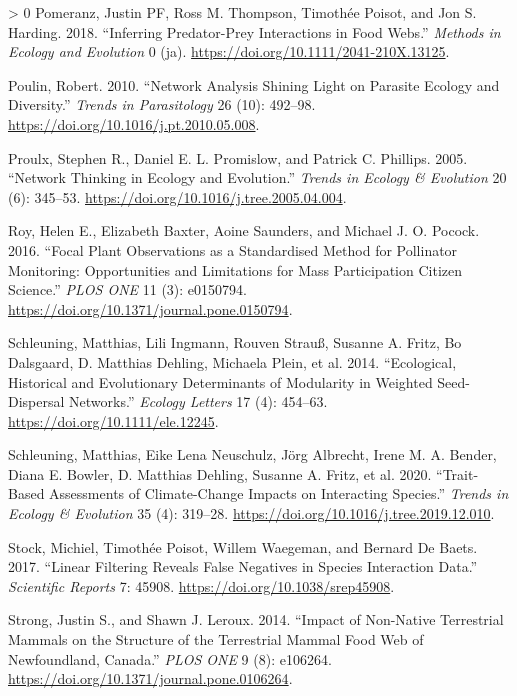 \documentclass[11pt]{article}
\newlength{\cslhangindent}
\newenvironment{CSLReferences}[3] %
 {%
  \setlength{\parindent}{0pt}
  \ifodd #1 \everypar{\setlength{\hangindent}{\cslhangindent}}\ignorespaces\fi
  \ifnum #2 > 0
  \setlength{\parskip}{#2\baselineskip}
  \fi
 }%
 {}
\begin{document}
\begin{CSLReferences}{1}{0}
\leavevmode\hypertarget{ref-Pomeranz2018InfPre}{}%
Pomeranz, Justin PF, Ross M. Thompson, Timothée Poisot, and Jon S.
Harding. 2018. {``Inferring Predator-Prey Interactions in Food Webs.''}
\emph{Methods in Ecology and Evolution} 0 (ja).
\url{https://doi.org/10.1111/2041-210X.13125}.

\leavevmode\hypertarget{ref-Poulin2010NetAna}{}%
Poulin, Robert. 2010. {``Network Analysis Shining Light on Parasite
Ecology and Diversity.''} \emph{Trends in Parasitology} 26 (10):
492--98. \url{https://doi.org/10.1016/j.pt.2010.05.008}.

\leavevmode\hypertarget{ref-Proulx2005NetThi}{}%
Proulx, Stephen R., Daniel E. L. Promislow, and Patrick C. Phillips.
2005. {``Network Thinking in Ecology and Evolution.''} \emph{Trends in
Ecology \& Evolution} 20 (6): 345--53.
\url{https://doi.org/10.1016/j.tree.2005.04.004}.

\leavevmode\hypertarget{ref-Roy2016FocPla}{}%
Roy, Helen E., Elizabeth Baxter, Aoine Saunders, and Michael J. O.
Pocock. 2016. {``Focal Plant Observations as a Standardised Method for
Pollinator Monitoring: Opportunities and Limitations for Mass
Participation Citizen Science.''} \emph{PLOS ONE} 11 (3): e0150794.
\url{https://doi.org/10.1371/journal.pone.0150794}.

\leavevmode\hypertarget{ref-Schleuning2014EcoHis}{}%
Schleuning, Matthias, Lili Ingmann, Rouven Strauß, Susanne A. Fritz, Bo
Dalsgaard, D. Matthias Dehling, Michaela Plein, et al. 2014.
{``Ecological, Historical and Evolutionary Determinants of Modularity in
Weighted Seed-Dispersal Networks.''} \emph{Ecology Letters} 17 (4):
454--63. \url{https://doi.org/10.1111/ele.12245}.

\leavevmode\hypertarget{ref-Schleuning2020TraAss}{}%
Schleuning, Matthias, Eike Lena Neuschulz, Jörg Albrecht, Irene M. A.
Bender, Diana E. Bowler, D. Matthias Dehling, Susanne A. Fritz, et al.
2020. {``Trait-Based Assessments of Climate-Change Impacts on
Interacting Species.''} \emph{Trends in Ecology \& Evolution} 35 (4):
319--28. \url{https://doi.org/10.1016/j.tree.2019.12.010}.

\leavevmode\hypertarget{ref-Stock2017LinFil}{}%
Stock, Michiel, Timothée Poisot, Willem Waegeman, and Bernard De Baets.
2017. {``Linear Filtering Reveals False Negatives in Species Interaction
Data.''} \emph{Scientific Reports} 7: 45908.
\url{https://doi.org/10.1038/srep45908}.

\leavevmode\hypertarget{ref-Strong2014ImpNon}{}%
Strong, Justin S., and Shawn J. Leroux. 2014. {``Impact of Non-Native
Terrestrial Mammals on the Structure of the Terrestrial Mammal Food Web
of Newfoundland, Canada.''} \emph{PLOS ONE} 9 (8): e106264.
\url{https://doi.org/10.1371/journal.pone.0106264}.


\end{CSLReferences}
\end{document}
